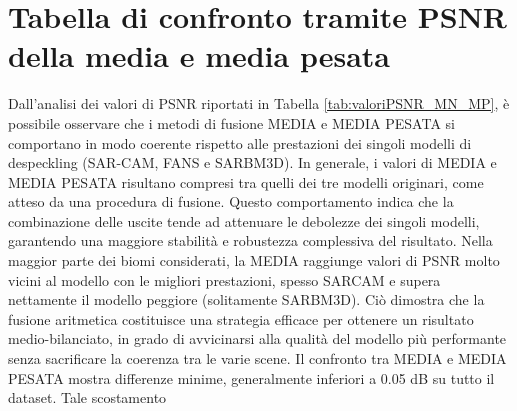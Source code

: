 \section{Tabella di confronto tramite PSNR della media e media pesata}
\begin{table}[H] %
  \centering
  \caption{Confronto dei modelli di despeckling e della loro fusione. 
            I valori sopra, indicano la media del PSNR di 100 immagini rappresentanti diversi biomi.
            Ogni modello per la previsione della qualità, usato in MEDIA PESATA, 
            è stato allenato per 10 epoche con un dataset da 30'000 
            immagini. }
  \label{tab:valoriPSNR_MN_MP}
\end{table}    
Dall’analisi dei valori di PSNR riportati in Tabella \ref{tab:valoriPSNR_MN_MP}, è possibile osservare che i metodi di fusione 
MEDIA e MEDIA PESATA si comportano in modo coerente rispetto alle prestazioni dei singoli modelli di despeckling (SAR-CAM, FANS e SARBM3D). 
In generale, i valori di MEDIA e MEDIA PESATA risultano compresi tra quelli dei tre modelli originari, come atteso da una procedura di 
fusione. Questo comportamento indica che la combinazione delle uscite tende ad attenuare le debolezze dei singoli modelli, garantendo una 
maggiore stabilità e robustezza complessiva del risultato.
Nella maggior parte dei biomi considerati, la MEDIA raggiunge valori di PSNR molto vicini al modello con le migliori prestazioni, spesso SARCAM e 
supera nettamente il modello peggiore (solitamente SARBM3D). Ciò dimostra che la fusione aritmetica costituisce una strategia efficace per 
ottenere un risultato medio-bilanciato, in grado di avvicinarsi alla qualità del modello più performante senza sacrificare la coerenza tra le varie scene.
Il confronto tra MEDIA e MEDIA PESATA mostra differenze minime, generalmente inferiori a 0.05 dB su tutto il dataset. Tale scostamento 
